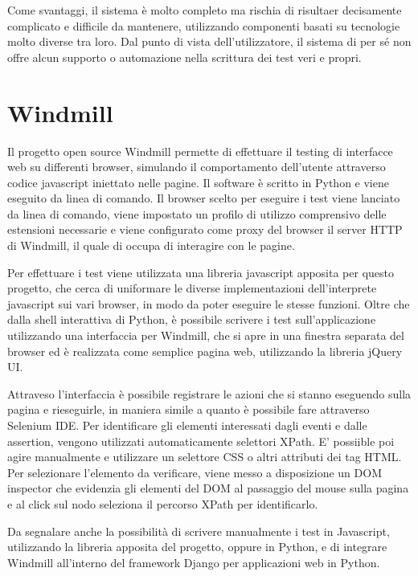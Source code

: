 \documentclass[12pt]{toptesi}
\begin{document}
Come svantaggi, il sistema è molto completo ma rischia di risultaer decisamente complicato e difficile da mantenere, utilizzando componenti basati su tecnologie molto diverse tra loro. Dal punto di vista dell'utilizzatore, il sistema di per sé non offre alcun supporto o automazione nella scrittura dei test veri e propri. 

\section{Windmill}

Il progetto open source Windmill permette di effettuare il testing di interfacce web su differenti browser, simulando il comportamento dell'utente attraverso codice javascript iniettato nelle pagine. Il software è scritto in Python e viene eseguito da linea di comando. Il browser scelto per eseguire i test viene lanciato da linea di comando, viene impostato un profilo di utilizzo comprensivo delle estensioni necessarie e viene configurato come proxy del browser il server HTTP di Windmill, il quale di occupa di interagire con le pagine. 

Per effettuare i test viene utilizzata una libreria javascript apposita per questo progetto, che cerca di uniformare le diverse implementazioni dell'interprete javascript sui vari browser, in modo da poter eseguire le stesse funzioni. 
Oltre che dalla shell interattiva di Python, è possibile scrivere i test sull'applicazione utilizzando una interfaccia per Windmill, che si apre in una finestra separata del browser ed è realizzata come semplice pagina web, utilizzando la libreria jQuery UI. 

Attraveso l'interfaccia è possibile registrare le azioni che si stanno eseguendo sulla pagina e rieseguirle, in maniera simile a quanto è possibile fare attraverso Selenium IDE. Per identificare gli elementi interessati dagli eventi e dalle assertion, vengono utilizzati automaticamente selettori XPath. E' possiible poi agire manualmente e utilizzare un selettore CSS o altri attributi dei tag HTML. Per selezionare l'elemento da verificare, viene messo a disposizione un DOM inspector che evidenzia gli elementi del DOM al passaggio del mouse sulla pagina e al click sul nodo seleziona il percorso XPath per identificarlo.

Da segnalare anche la possibilità di scrivere manualmente i test in Javascript, utilizzando la libreria apposita del progetto, oppure in Python, e di integrare Windmill all'interno del framework Django per applicazioni web in Python.
\end{document}
